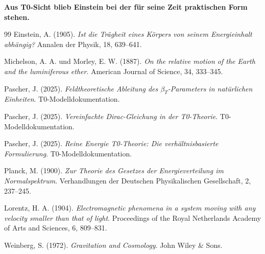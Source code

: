 	\textbf{Aus T0-Sicht blieb Einstein bei der für seine Zeit praktischen Form stehen.}
	\begin{thebibliography}{99}
		Einstein, A. (1905). \textit{Ist die Trägheit eines Körpers von seinem Energieinhalt abhängig?} Annalen der Physik, 18, 639--641.
		
		Michelson, A. A. und Morley, E. W. (1887). \textit{On the relative motion of the Earth and the luminiferous ether}. American Journal of Science, 34, 333--345.
		
		Pascher, J. (2025). \textit{Feldtheoretische Ableitung des $\beta_T$-Parameters in natürlichen Einheiten}. T0-Modelldokumentation.
		
		Pascher, J. (2025). \textit{Vereinfachte Dirac-Gleichung in der T0-Theorie}. T0-Modelldokumentation.
		
		Pascher, J. (2025). \textit{Reine Energie T0-Theorie: Die verhältnisbasierte Formulierung}. T0-Modelldokumentation.
		
		Planck, M. (1900). \textit{Zur Theorie des Gesetzes der Energieverteilung im Normalspektrum}. Verhandlungen der Deutschen Physikalischen Gesellschaft, 2, 237--245.
		
		Lorentz, H. A. (1904). \textit{Electromagnetic phenomena in a system moving with any velocity smaller than that of light}. Proceedings of the Royal Netherlands Academy of Arts and Sciences, 6, 809--831.
		
		Weinberg, S. (1972). \textit{Gravitation and Cosmology}. John Wiley \& Sons.
	\end{thebibliography}